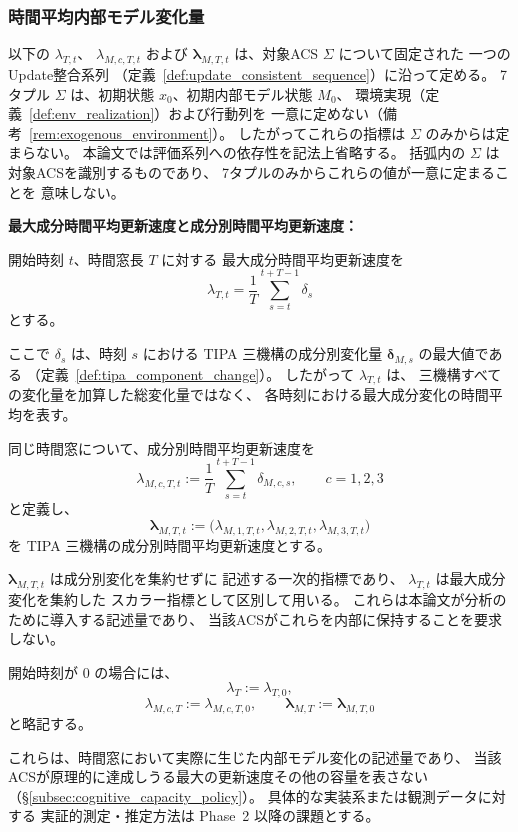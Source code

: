 \subsubsection{時間平均内部モデル変化量}

\begin{definition}
\label{def:update_quality}

以下の
$\lambda_{T,t}$、
$\lambda_{M,c,T,t}$ および
$\boldsymbol{\lambda}_{M,T,t}$ は、対象ACS $\Sigma$ について固定された
一つのUpdate整合系列
（定義~\ref{def:update_consistent_sequence}）に沿って定める。
7タプル $\Sigma$ は、初期状態 $x_0$、初期内部モデル状態 $M_0$、
環境実現（定義~\ref{def:env_realization}）および行動列を
一意に定めない（備考~\ref{rem:exogenous_environment}）。
したがってこれらの指標は $\Sigma$ のみからは定まらない。
本論文では評価系列への依存性を記法上省略する。
括弧内の $\Sigma$ は対象ACSを識別するものであり、
7タプルのみからこれらの値が一意に定まることを
意味しない。

\medskip
\noindent\textbf{最大成分時間平均更新速度と成分別時間平均更新速度：}

開始時刻 $t$、時間窓長 $T$ に対する
最大成分時間平均更新速度を
\[
  \lambda_{T,t}
  =
  \frac{1}{T}
  \sum_{s=t}^{t+T-1}\delta_s
\]
とする。

ここで $\delta_s$ は、時刻 $s$ における
TIPA 三機構の成分別変化量
$\boldsymbol{\delta}_{M,s}$ の最大値である
（定義~\ref{def:tipa_component_change}）。
したがって $\lambda_{T,t}$ は、
三機構すべての変化量を加算した総変化量ではなく、
各時刻における最大成分変化の時間平均を表す。

同じ時間窓について、成分別時間平均更新速度を
\[
  \lambda_{M,c,T,t}
  :=
  \frac{1}{T}
  \sum_{s=t}^{t+T-1}
  \delta_{M,c,s},
  \qquad
  c=1,2,3
\]
と定義し、
\[
  \boldsymbol{\lambda}_{M,T,t}
  :=
  \bigl(
    \lambda_{M,1,T,t},
    \lambda_{M,2,T,t},
    \lambda_{M,3,T,t}
  \bigr)
\]
を TIPA 三機構の成分別時間平均更新速度とする。

$\boldsymbol{\lambda}_{M,T,t}$ は成分別変化を集約せずに
記述する一次的指標であり、
$\lambda_{T,t}$ は最大成分変化を集約した
スカラー指標として区別して用いる。
これらは本論文が分析のために導入する記述量であり、
当該ACSがこれらを内部に保持することを要求しない。

開始時刻が $0$ の場合には、
\[
  \lambda_T
  :=
  \lambda_{T,0},
\]
\[
  \lambda_{M,c,T}
  :=
  \lambda_{M,c,T,0},
  \qquad
  \boldsymbol{\lambda}_{M,T}
  :=
  \boldsymbol{\lambda}_{M,T,0}
\]
と略記する。

\medskip
これらは、時間窓において実際に生じた内部モデル変化の記述量であり、
当該ACSが原理的に達成しうる最大の更新速度その他の容量を表さない
（\S\ref{subsec:cognitive_capacity_policy}）。
具体的な実装系または観測データに対する
実証的測定・推定方法は Phase~2 以降の課題とする。
\end{definition}

